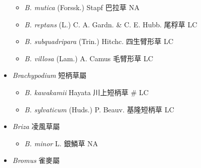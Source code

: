 \begin{itemize}
  \begin{itemize}
        \item[] \textit{B. mutica} (Forssk.) Stapf  巴拉草   NA
        \item[] \textit{B. reptans} (L.) C. A. Gardn. \& C. E. Hubb.  尾稃草   LC
        \item[] \textit{B. subquadripara} (Trin.) Hitchc.  四生臂形草   LC
        \item[] \textit{B. villosa} (Lam.) A. Camus  毛臂形草   LC
  \end{itemize}
 \item[] \textit{Brachypodium} 短柄草屬
                                
  \begin{itemize}
        \item[] \textit{B. kawakamii} Hayata  川上短柄草  \# LC
        \item[] \textit{B. sylvaticum} (Huds.) P. Beauv.  基隆短柄草   LC
  \end{itemize}
 \item[] \textit{Briza} 凌風草屬
                                
  \begin{itemize}
        \item[] \textit{B. minor} L.  銀鱗草   NA
  \end{itemize}
 \item[] \textit{Bromus} 雀麥屬
                                

\end{itemize}
